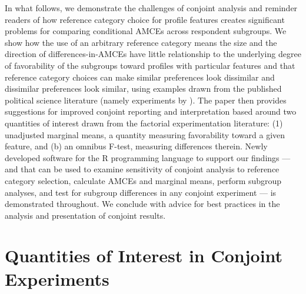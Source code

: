 \documentclass[a4paper,12pt]{article}\usepackage[]{graphicx}\usepackage[]{color}
\begin{document}
In what follows, we demonstrate the challenges of conjoint analysis and reminder readers of how reference category choice for profile features creates significant problems for comparing conditional AMCEs across respondent subgroups. We show how the use of an arbitrary reference category means the size and the direction of differences-in-AMCEs have little relationship to the underlying degree of favorability of the subgroups toward profiles with particular features and that reference category choices can make similar preferences look dissimilar and dissimilar preferences look similar, using examples drawn from the published political science literature (namely experiments by \citealt{HainmuellerHopkinsYamamoto2014, BallardRosaMartinScheve2016, TeeleKallaRosenbluth2018}). The paper then provides suggestions for improved conjoint reporting and interpretation based around two quantities of interest drawn from the factorial experimentation literature: (1) unadjusted marginal means, a quantity measuring favorability toward a given feature, and (b) an omnibus F-test, measuring differences therein. Newly developed software for the R programming language to support our findings --- and that can be used to examine sensitivity of conjoint analysis to reference category selection, calculate AMCEs and marginal means, perform subgroup analyses, and test for subgroup differences in any conjoint experiment --- is demonstrated throughout. We conclude with advice for best practices in the analysis and presentation of conjoint results.

\section*{Quantities of Interest in Conjoint Experiments}\label{sec:quantities}
\end{document}
